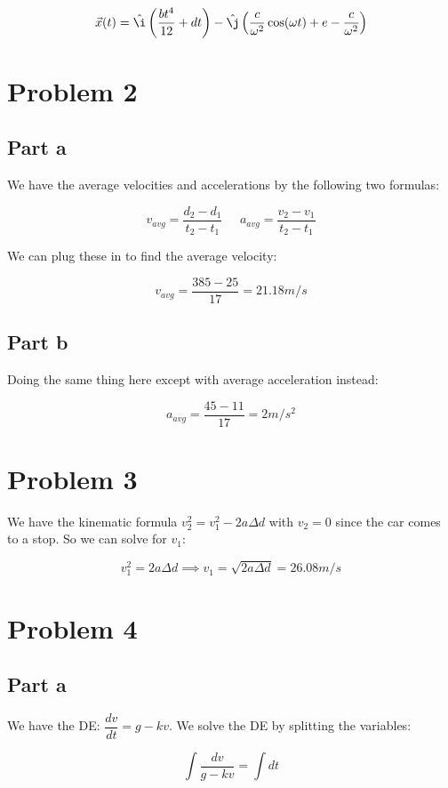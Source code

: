 \documentclass{article}
\theoremstyle{definition}
\numberwithin{equation}{section}
\numberwithin{definition}{section}
\begin{document}
	\[ \vec x(t) = \hat \i \left(\frac{bt^4}{12} + dt\right) - \hat \j \left(\frac{c}{\omega^2} \cos(\omega t) + e - \frac{c}{\omega^2}\right)\]
	
	
	\section{Problem 2}
	

	
	
	\subsection{Part a}
	
		We have the average velocities and accelerations by the following two formulas:
	
	\[ v_{avg} = \frac{d_2-d_1}{t_2-t_1} \phantom{abc} a_{avg} = \frac{v_2 - v_1}{t_2-t_1}\]
	
	We can plug these in to find the average velocity:
	
	\[ v_{avg} = \frac{385-25}{17} = 21.18 m/s \]
	
	\subsection{Part b}
	Doing the same thing here except with average acceleration instead:
	
	\[ a_{avg} = \frac{45-11}{17} = 2 m/s^2\]
	
	\section{Problem 3}
	
	We have the kinematic formula $v_2^2 = v_1^2 - 2a\Delta d$ with $v_2 = 0$ since the car comes to a stop. So we can solve for $v_1$:
	
	
	\[	v_1^2 = 2a \Delta d \implies v_1 = \sqrt{2a\Delta d} = 26.08 m/s\]
	
	\section{Problem 4}
	\subsection{Part a}
	
	We have the DE: $\dfrac{dv}{dt} = g - kv$. We solve the DE by splitting the variables: 
	
	\[ \int \frac{dv}{g - kv} = \int dt\]
	
\end{document}
